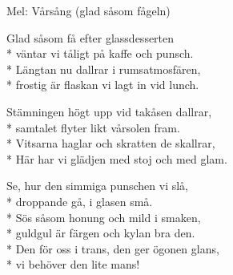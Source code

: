 \begin{SongText}
    \begin{SongInfo}
        Mel: Vårsång (glad såsom fågeln)
    \end{SongInfo}
    \begin{SongVerse}
        Glad såsom få efter glassdesserten\\*%
        väntar vi tåligt på kaffe och punsch.\\*%
        Längtan nu dallrar i rumsatmosfären,\\*%
        frostig är flaskan vi lagt in vid lunch.
    \end{SongVerse}
    \begin{SongVerse}
        Stämningen högt upp vid takåsen dallrar,\\*%
        samtalet flyter likt vårsolen fram.\\*%
        Vitsarna haglar och skratten de skallrar,\\*%
        Här har vi glädjen med stoj och med glam.
    \end{SongVerse}
    \begin{SongVerse}
        Se, hur den simmiga punschen vi slå,\\*%
        droppande gå, i glasen små.\\*%
        Sös såsom honung och mild i smaken,\\*%
        guldgul är färgen och kylan bra den.\\*%
        Den för oss i trans, den ger ögonen glans,\\*%
        vi behöver den lite mans!
    \end{SongVerse}
\end{SongText}
